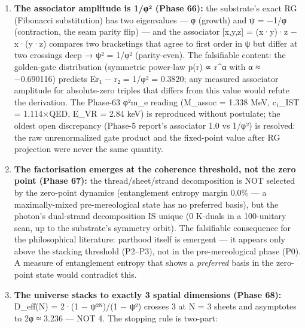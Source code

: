 \documentclass[
]{article}
\begin{document}
\begin{enumerate}
  exact contrast to the temporal axis's open hyperbolic growth
  (substitution eigenvalue φ). The runtime-level falsifiable content:
  any drift in the Ω cycle's amplitude, or any parity structure with
  period ≠ 2, would refute the duality's first layer. The strong form
  --- the elliptic zero point as the pre-geometric dual of the metric
  signature --- predicts that the zero-point direction contributes
  \emph{no} open (causal) structure to the emergent manifold: a
  specific, testable statement for any future formalization of the
  substrate's signature.
\item
  \textbf{The associator amplitude is 1/φ² (Phase 66):} the substrate's
  exact RG (Fibonacci substitution) has two eigenvalues --- φ (growth)
  and ψ = −1/φ (contraction, the seam parity flip) --- and the
  associator {[}x,y,z{]} = (x·y)·z − x·(y·z) compares two bracketings
  that agree to first order in ψ but differ at two crossings deep → ψ² =
  1/φ² (parity-even). The falsifiable content: the golden-gate
  distribution (symmetric power-law p(r) ∝ \textbar r\textbar\^{}α with
  α ≈ −0.690116) predicts E\textbar r₁ − r₂\textbar{} = 1/φ² = 0.3820;
  any measured associator amplitude for absolute-zero triples that
  differs from this value would refute the derivation. The Phase-63
  φ²m\_e reading (M\_assoc = 1.338 MeV, c₁\_IST = 1.114×QED, E\_VR =
  2.84 keV) is reproduced without postulate; the oldest open discrepancy
  (Phase-5 report's associator 1.0 vs 1/φ²) is resolved: the raw
  unrenormalized gate product and the fixed-point value after RG
  projection were never the same quantity.
\item
  \textbf{The factorisation emerges at the coherence threshold, not the
  zero point (Phase 67):} the thread/sheet/strand decomposition is NOT
  selected by the zero-point dynamics (entanglement entropy margin 0.0\%
  --- a maximally-mixed pre-mereological state has no preferred basis),
  but the photon's dual-strand decomposition IS unique (0 K-duals in a
  100-unitary scan, up to the substrate's symmetry orbit). The
  falsifiable consequence for the philosophical literature: parthood
  itself is emergent --- it appears only above the stacking threshold
  (P2--P3), not in the pre-mereological phase (P0). A measure of
  entanglement entropy that shows a \emph{preferred} basis in the
  zero-point state would contradict this.
\item
  \textbf{The universe stacks to exactly 3 spatial dimensions (Phase
  68):} D\_eff(N) = 2·(1 − ψ²ᴺ)/(1 − ψ²) crosses 3 at N = 3 sheets and
  asymptotes to 2φ ≈ 3.236 --- NOT 4. The stopping rule is two-part:

\end{enumerate}
\end{document}
